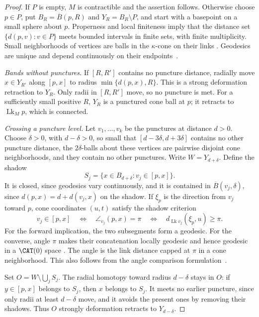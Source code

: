 \begin{proof}
If \(P\) is empty, \(M\) is contractible and the assertion follows.
Otherwise choose \(p\in P\), put \(B_R=\overline B(p,R)\) and
\(Y_R=B_R\setminus P\), and start with a basepoint on a small sphere
about \(p\). Properness and local finiteness imply that the distance
set \(\{d(p,v):v\in P\}\) meets bounded intervals in finite sets,
with finite multiplicity. Small neighborhoods of vertices are balls
in the \(\kappa\)-cone on their links
\cite[Theorem~I.7.39]{BH}. Geodesics are unique and depend continuously
on their endpoints~\cite[Proposition~II.1.4(1)]{BH}.

\smallskip\noindent
\emph{Bands without punctures.}
If \([R,R']\) contains no puncture distance, radially move \(x\in
Y_{R'}\) along \([p,x]\) to radius \(\min\{d(p,x),R\}\).
This is a strong deformation retraction to \(Y_R\). Only radii in
\([R,R']\) move, so no puncture is met. For a sufficiently small
positive \(R\), \(Y_R\) is a punctured cone ball at \(p\); it retracts
to \(\operatorname{Lk}_M p\), which is connected.

\smallskip\noindent
\emph{Crossing a puncture level.}
Let \(v_1,\ldots,v_k\) be the punctures at distance \(d>0\).
Choose \(\delta>0\), with \(d-\delta>0\), so small that
\([d-3\delta,d+3\delta]\) contains no other puncture distance,
the \(2\delta\)-balls about these vertices are pairwise disjoint
cone neighborhoods, and they contain no other punctures. Write
\(W=Y_{d+\delta}\). Define the shadow
\[
 S_j=\{x\in B_{d+\delta}:v_j\in[p,x]\}.
\]
It is closed, since geodesics vary continuously, and it is contained
in \(\overline B(v_j,\delta)\), since
\(d(p,x)=d+d(v_j,x)\) on the shadow.
If \(\xi_p\) is the direction from \(v_j\) toward \(p\), cone
coordinates \((u,t)\) satisfy the shadow criterion
\begin{equation}\label{eq:shadow-criterion}
 v_j\in[p,x]\quad\Longleftrightarrow\quad
 \angle_{v_j}(p,x)=\pi
 \quad\Longleftrightarrow\quad
 d_{\operatorname{Lk}v_j}(\xi_p,u)\ge\pi.
\end{equation}
For the forward implication, the two subsegments form a geodesic.
For the converse, angle \(\pi\) makes their concatenation locally
geodesic and hence geodesic in a \(\CAT(0)\) space
\cite[Proposition~II.1.4(2)]{BH}. The angle is the link distance capped
at \(\pi\) in a cone neighborhood. This also follows from the angle
comparison formulation~\cite[Proposition~II.1.7(4)]{BH}.

Set \(O=W\setminus\bigcup_jS_j\). The radial homotopy toward radius
\(d-\delta\) stays in \(O\): if \(y\in[p,x]\) belongs to \(S_j\),
then \(x\) belongs to \(S_j\). It meets no earlier puncture, since
only radii at least \(d-\delta\) move, and it avoids the present ones
by removing their shadows. Thus \(O\) strongly deformation retracts
to \(Y_{d-\delta}\).


\end{proof}
